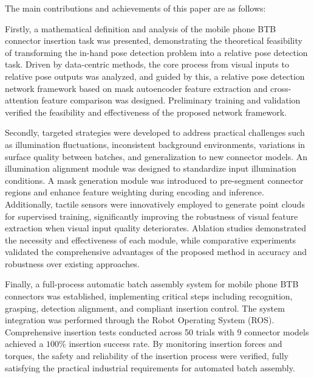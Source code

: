\documentclass{Diploma}
\begin{document}
The main contributions and achievements of this paper are as follows:

Firstly, a mathematical definition and analysis of the mobile phone BTB connector insertion task was presented, demonstrating the theoretical feasibility of transforming the in-hand pose detection problem into a relative pose detection task. Driven by data-centric methods, the core process from visual inputs to relative pose outputs was analyzed, and guided by this, a relative pose detection network framework based on mask autoencoder feature extraction and cross-attention feature comparison was designed. Preliminary training and validation verified the feasibility and effectiveness of the proposed network framework.

Secondly, targeted strategies were developed to address practical challenges such as illumination fluctuations, inconsistent background environments, variations in surface quality between batches, and generalization to new connector models. An illumination alignment module was designed to standardize input illumination conditions. A mask generation module was introduced to pre-segment connector regions and enhance feature weighting during encoding and inference. Additionally, tactile sensors were innovatively employed to generate point clouds for supervised training, significantly improving the robustness of visual feature extraction when visual input quality deteriorates. Ablation studies demonstrated the necessity and effectiveness of each module, while comparative experiments validated the comprehensive advantages of the proposed method in accuracy and robustness over existing approaches.

Finally, a full-process automatic batch assembly system for mobile phone BTB connectors was established, implementing critical steps including recognition, grasping, detection alignment, and compliant insertion control. The system integration was performed through the Robot Operating System (ROS). Comprehensive insertion tests conducted across 50 trials with 9 connector models achieved a $100\%$ insertion success rate. By monitoring insertion forces and torques, the safety and reliability of the insertion process were verified, fully satisfying the practical industrial requirements for automated batch assembly.


\ListOfContents
\end{document}

